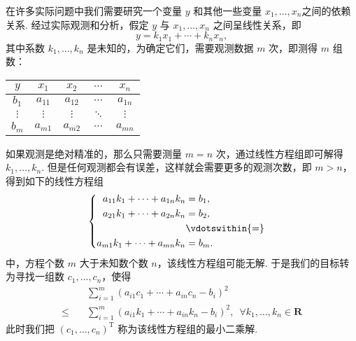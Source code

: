 在许多实际问题中我们需要研究一个变量 $ y $ 和其他一些变量 $ x_1, \ldots , x_n $之间的依赖关系. 经过实际观测和分析，假定 $ y $ 与 $ x_1, \ldots , x_n $ 之间呈线性关系，即
\[ y = k_1 x_1 + \cdots + k_n x_n, \]
其中系数 $ k_1, \ldots , k_n $ 是未知的，为确定它们，需要观测数据 $ m $ 次，即测得 $ m $ 组数：
\begin{center}
    \begin{tabular}{ccccc}
        $ y $      & $ x_1 $    & $ x_2 $    & $ \cdots $ & $ x_n $    \\
        \hline
        $ b_1 $    & $ a_{11} $ & $ a_{12} $ & $ \cdots $ & $ a_{1n}$  \\
        $ \vdots $ & $ \vdots $ & $ \vdots $ & $ \ddots $ & $ \vdots $ \\
        $ b_m $    & $ a_{m1} $ & $ a_{m2} $ & $ \cdots $ & $ a_{mn}$
    \end{tabular}
\end{center}
如果观测是绝对精准的，那么只需要测量 $ m = n $ 次，通过线性方程组即可解得 $ k_1, \ldots , k_n $. 但是任何观测都会有误差，这样就会需要更多的观测次数，即 $ m > n $，得到如下的线性方程组
\[ \begin{cases} \begin{aligned}
            a_{11}k_1 + \cdots + a_{1n}k_n & = b_1,          \\
            a_{21}k_1 + \cdots + a_{2n}k_n & = b_2,          \\
                                           & \vdotswithin{=} \\
            a_{m1}k_1 + \cdots + a_{mn}k_n & = b_m.          \\
        \end{aligned} \end{cases} \]
中，方程个数 $ m $ 大于未知数个数 $ n $，该线性方程组可能无解. 于是我们的目标转为寻找一组数 $ c_1, \ldots , c_n $，使得
\begin{align*}
                    & \sum_{ i = 1 }^{m} (a_{i1}c_1 + \cdots + a_{in}c_n - b_i )^{2}                                                    \\
    \leqslant \quad & \sum_{ i = 1 }^{m} (a_{i1}k_1 + \cdots + a_{in}k_n - b_i )^{2}, \enspace \forall k_1, \ldots , k_n \in \mathbf{R}
\end{align*}
此时我们把 $ (c_1, \ldots , c_n)^{\mathrm{T}} $ 称为该线性方程组的最小二乘解.

